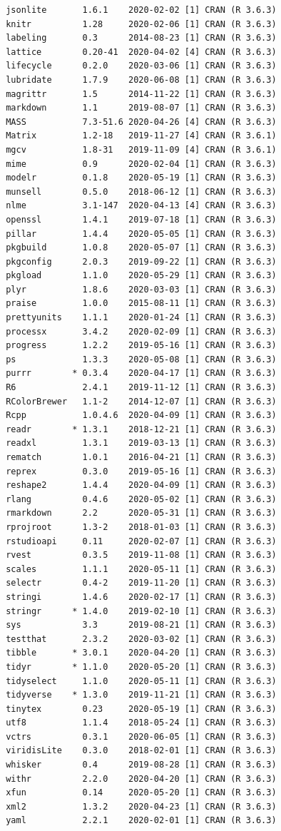 \documentclass[11pt,oneside]{report}
\begin{document}
\begin{verbatim}
 jsonlite       1.6.1    2020-02-02 [1] CRAN (R 3.6.3)
 knitr          1.28     2020-02-06 [1] CRAN (R 3.6.3)
 labeling       0.3      2014-08-23 [1] CRAN (R 3.6.3)
 lattice        0.20-41  2020-04-02 [4] CRAN (R 3.6.3)
 lifecycle      0.2.0    2020-03-06 [1] CRAN (R 3.6.3)
 lubridate      1.7.9    2020-06-08 [1] CRAN (R 3.6.3)
 magrittr       1.5      2014-11-22 [1] CRAN (R 3.6.3)
 markdown       1.1      2019-08-07 [1] CRAN (R 3.6.3)
 MASS           7.3-51.6 2020-04-26 [4] CRAN (R 3.6.3)
 Matrix         1.2-18   2019-11-27 [4] CRAN (R 3.6.1)
 mgcv           1.8-31   2019-11-09 [4] CRAN (R 3.6.1)
 mime           0.9      2020-02-04 [1] CRAN (R 3.6.3)
 modelr         0.1.8    2020-05-19 [1] CRAN (R 3.6.3)
 munsell        0.5.0    2018-06-12 [1] CRAN (R 3.6.3)
 nlme           3.1-147  2020-04-13 [4] CRAN (R 3.6.3)
 openssl        1.4.1    2019-07-18 [1] CRAN (R 3.6.3)
 pillar         1.4.4    2020-05-05 [1] CRAN (R 3.6.3)
 pkgbuild       1.0.8    2020-05-07 [1] CRAN (R 3.6.3)
 pkgconfig      2.0.3    2019-09-22 [1] CRAN (R 3.6.3)
 pkgload        1.1.0    2020-05-29 [1] CRAN (R 3.6.3)
 plyr           1.8.6    2020-03-03 [1] CRAN (R 3.6.3)
 praise         1.0.0    2015-08-11 [1] CRAN (R 3.6.3)
 prettyunits    1.1.1    2020-01-24 [1] CRAN (R 3.6.3)
 processx       3.4.2    2020-02-09 [1] CRAN (R 3.6.3)
 progress       1.2.2    2019-05-16 [1] CRAN (R 3.6.3)
 ps             1.3.3    2020-05-08 [1] CRAN (R 3.6.3)
 purrr        * 0.3.4    2020-04-17 [1] CRAN (R 3.6.3)
 R6             2.4.1    2019-11-12 [1] CRAN (R 3.6.3)
 RColorBrewer   1.1-2    2014-12-07 [1] CRAN (R 3.6.3)
 Rcpp           1.0.4.6  2020-04-09 [1] CRAN (R 3.6.3)
 readr        * 1.3.1    2018-12-21 [1] CRAN (R 3.6.3)
 readxl         1.3.1    2019-03-13 [1] CRAN (R 3.6.3)
 rematch        1.0.1    2016-04-21 [1] CRAN (R 3.6.3)
 reprex         0.3.0    2019-05-16 [1] CRAN (R 3.6.3)
 reshape2       1.4.4    2020-04-09 [1] CRAN (R 3.6.3)
 rlang          0.4.6    2020-05-02 [1] CRAN (R 3.6.3)
 rmarkdown      2.2      2020-05-31 [1] CRAN (R 3.6.3)
 rprojroot      1.3-2    2018-01-03 [1] CRAN (R 3.6.3)
 rstudioapi     0.11     2020-02-07 [1] CRAN (R 3.6.3)
 rvest          0.3.5    2019-11-08 [1] CRAN (R 3.6.3)
 scales         1.1.1    2020-05-11 [1] CRAN (R 3.6.3)
 selectr        0.4-2    2019-11-20 [1] CRAN (R 3.6.3)
 stringi        1.4.6    2020-02-17 [1] CRAN (R 3.6.3)
 stringr      * 1.4.0    2019-02-10 [1] CRAN (R 3.6.3)
 sys            3.3      2019-08-21 [1] CRAN (R 3.6.3)
 testthat       2.3.2    2020-03-02 [1] CRAN (R 3.6.3)
 tibble       * 3.0.1    2020-04-20 [1] CRAN (R 3.6.3)
 tidyr        * 1.1.0    2020-05-20 [1] CRAN (R 3.6.3)
 tidyselect     1.1.0    2020-05-11 [1] CRAN (R 3.6.3)
 tidyverse    * 1.3.0    2019-11-21 [1] CRAN (R 3.6.3)
 tinytex        0.23     2020-05-19 [1] CRAN (R 3.6.3)
 utf8           1.1.4    2018-05-24 [1] CRAN (R 3.6.3)
 vctrs          0.3.1    2020-06-05 [1] CRAN (R 3.6.3)
 viridisLite    0.3.0    2018-02-01 [1] CRAN (R 3.6.3)
 whisker        0.4      2019-08-28 [1] CRAN (R 3.6.3)
 withr          2.2.0    2020-04-20 [1] CRAN (R 3.6.3)
 xfun           0.14     2020-05-20 [1] CRAN (R 3.6.3)
 xml2           1.3.2    2020-04-23 [1] CRAN (R 3.6.3)
 yaml           2.2.1    2020-02-01 [1] CRAN (R 3.6.3)


\end{verbatim}
\end{document}
